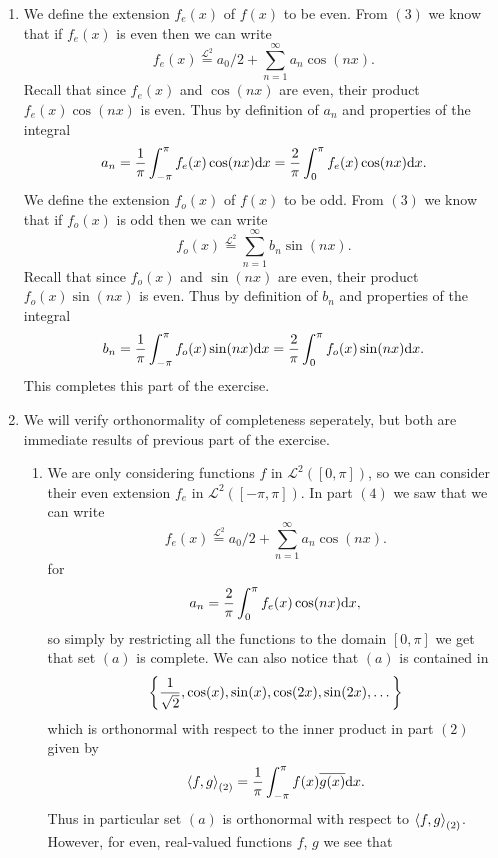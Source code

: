 \documentclass[11pt,a4paper]{article}
\begin{document}
\begin{solution}
\begin{enumerate}
\[      \]
    \item[(4)] We define the extension $f_e(x)$ of $f(x)$ to be even.
      From $(3)$ we know that if $f_e(x)$ is even then we can write
      \[
        f_e(x) \overset{\mathcal L^2}{=} a_0/2 + \sum_{n=1}^{\infty} a_n \cos(nx).
      \]
      Recall that since $f_e(x)$ and $\cos(nx)$ are even,
      their product $f_e(x) \cos(nx)$ is even.
      Thus by definition of $a_n$ and properties of the integral
      \[
        a_n =
        \frac{1}{\pi} \int_{-\pi}^{\pi} f_e(x) \cos(nx) \dx =
        \frac{2}{\pi} \int_{0}^{\pi} f_e(x) \cos(nx) \dx.
      \]
      We define the extension $f_o(x)$ of $f(x)$ to be odd.
      From $(3)$ we know that if $f_o(x)$ is odd then we can write
      \[
        f_o(x) \overset{\mathcal L^2}{=} \sum_{n=1}^{\infty} b_n \sin(nx).
      \]
      Recall that since $f_o(x)$ and $\sin(nx)$ are even,
      their product $f_o(x) \sin(nx)$ is even.
      Thus by definition of $b_n$ and properties of the integral
      \[
        b_n =
        \frac{1}{\pi} \int_{-\pi}^{\pi} f_o(x) \sin(nx) \dx =
        \frac{2}{\pi} \int_{0}^{\pi} f_o(x) \sin(nx) \dx.
      \]
      This completes this part of the exercise.
    \item[(5)] We will verify orthonormality of completeness seperately,
      but both are immediate results of previous part of the exercise.
      \begin{enumerate}
        \item[(a)] We are only considering functions $f$ in $\mathcal L^2([0,\pi])$,
          so we can consider their even extension $f_e$ in $\mathcal L^2([-\pi,\pi])$.
          In part $(4)$ we saw that we can write
          \[
            f_e(x) \overset{\mathcal L^2}{=} a_0/2 + \sum_{n=1}^{\infty} a_n \cos(nx).
          \]
          for
          \[
            a_n =
            \frac{2}{\pi} \int_{0}^{\pi} f_e(x) \cos(nx) \dx,
          \]
          so simply by restricting all the functions to the domain
          $[0,\pi]$ we get that set $(a)$ is complete.
          We can also notice that $(a)$ is contained in
          \[
            \left\{\frac{1}{\sqrt{2}}, \cos(x), \sin(x), \cos(2x), \sin(2x),\dots\right\}
          \]
          which is orthonormal with respect to the inner product in
          part $(2)$ given by
          \[
            \ip{f}{g}_{(2)} =
            \frac{1}{\pi} \int_{-\pi}^{\pi} f(x) \overline{g(x)} \dx.
          \]
          Thus in particular set $(a)$ is orthonormal with respect to
          $\left\langle f, g \right\rangle_{(2)}$.
          However, for even, real-valued functions $f$, $g$ we see that

\end{enumerate}
\end{enumerate}
\end{solution}
\end{document}
